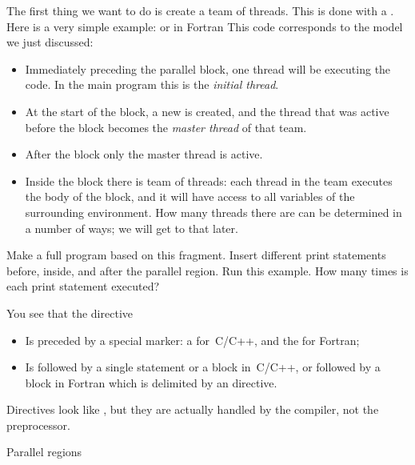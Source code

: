 The first thing we want to do is create a team of threads. This
is done with a .
Here is a very simple example:
or in Fortran
This code corresponds to the model we just discussed:
\begin{itemize}
\item Immediately preceding the parallel block, one thread will be
  executing the code. In the main program this is the \emph{initial
    thread}.
\item At the start of the block, a new  is
  created, and the thread that was active before the block
  becomes the \emph{master thread} of that team.
\item After the block only the master thread is active.
\item Inside the block there is team of threads: each thread in the
  team executes the body of the block, and it will have access to all
  variables of the surrounding environment.
  How many
  threads there are can be determined in a number of ways; we will get to that later.
\end{itemize}

\begin{exercise}
  Make a full program based on this fragment. Insert different print statements
  before, inside, and after the parallel region.
  Run this example. How many times is each print statement executed?
\end{exercise}

You see that the  directive
\begin{itemize}
\item Is preceded by a special marker: a  for~C/C++,
  and the   for Fortran;
\item Is followed by a single statement or a block in~C/C++,
  or followed by a block in Fortran which is delimited by an  directive.
\end{itemize}

Directives look like , but they
are actually handled by the compiler, not the preprocessor.

 {Parallel regions}

